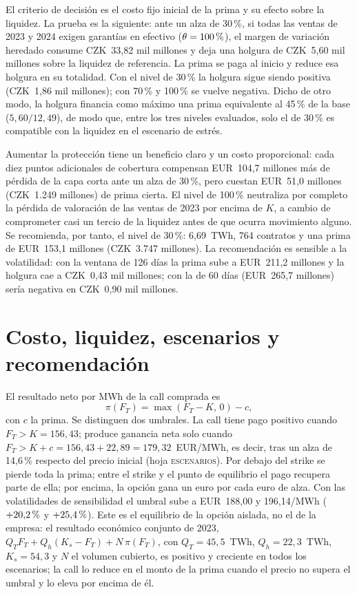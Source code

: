 \documentclass[11pt,letterpaper]{article}
\theoremstyle{plain}
\theoremstyle{definition}
\theoremstyle{remark}
\numberwithin{equation}{section}
\newcommand{\pc}{\mbox{\,\%}}
\begin{document}
El criterio de decisión es el costo fijo inicial de la prima y su efecto sobre la liquidez. La prueba es la siguiente: ante un alza de 30\pc{}, si todas las ventas de 2023 y 2024 exigen garantías en efectivo ($\theta=100\pc{}$), el margen de variación heredado consume CZK~33,82 mil millones y deja una holgura de CZK~5,60 mil millones sobre la liquidez de referencia. La prima se paga al inicio y reduce esa holgura en su totalidad. Con el nivel de 30\pc{} la holgura sigue siendo positiva (CZK~1,86 mil millones); con 70\pc{} y 100\pc{} se vuelve negativa. Dicho de otro modo, la holgura financia como máximo una prima equivalente al 45\pc{} de la base ($5{,}60/12{,}49$), de modo que, entre los tres niveles evaluados, solo el de 30\pc{} es compatible con la liquidez en el escenario de estrés.

Aumentar la protección tiene un beneficio claro y un costo proporcional: cada diez puntos adicionales de cobertura compensan EUR~104,7 millones más de pérdida de la capa corta ante un alza de 30\pc{}, pero cuestan EUR~51,0 millones (CZK~1.249 millones) de prima cierta. El nivel de 100\pc{} neutraliza por completo la pérdida de valoración de las ventas de 2023 por encima de $K$, a cambio de comprometer casi un tercio de la liquidez antes de que ocurra movimiento alguno. Se recomienda, por tanto, el nivel de 30\pc{}: 6,69~TWh, 764 contratos y una prima de EUR~153,1 millones (CZK~3.747 millones). La recomendación es sensible a la volatilidad: con la ventana de 126 días la prima sube a EUR~211,2 millones y la holgura cae a CZK~0,43 mil millones; con la de 60 días (EUR~265,7 millones) sería negativa en CZK~0,90 mil millones.

\section{Costo, liquidez, escenarios y recomendación}

El resultado neto por MWh de la call comprada es
\begin{equation}
\pi(F_T)=\max(F_T-K,\,0)-c,\label{eq:neto}
\end{equation}
con $c$ la prima. Se distinguen dos umbrales. La call tiene pago positivo cuando $F_T>K=156{,}43$; produce ganancia neta solo cuando $F_T>K+c=156{,}43+22{,}89=179{,}32$~EUR/MWh, es decir, tras un alza de 14,6\pc{} respecto del precio inicial (hoja \textsc{escenarios}). Por debajo del strike se pierde toda la prima; entre el strike y el punto de equilibrio el pago recupera parte de ella; por encima, la opción gana un euro por cada euro de alza. Con las volatilidades de sensibilidad el umbral sube a EUR~188,00 y 196,14/MWh ($+20{,}2\pc{}$ y $+25{,}4\pc{}$). Este es el equilibrio de la opción aislada, no el de la empresa: el resultado económico conjunto de 2023, $Q_TF_T+Q_h(K_s-F_T)+N\,\pi(F_T)$, con $Q_T=45{,}5$~TWh, $Q_h=22{,}3$~TWh, $K_s=54{,}3$ y $N$ el volumen cubierto, es positivo y creciente en todos los escenarios; la call lo reduce en el monto de la prima cuando el precio no supera el umbral y lo eleva por encima de él.
\end{document}
